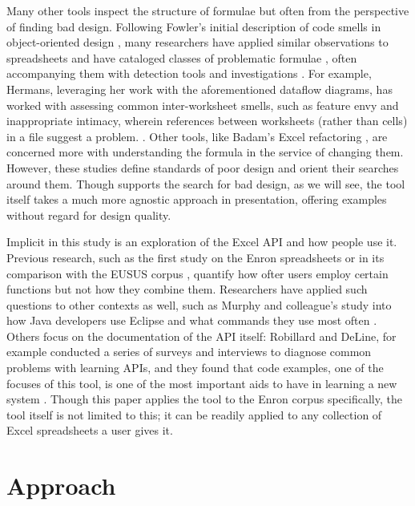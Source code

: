 \documentclass[conference]{IEEEtran}
\begin{document}
	Many other tools inspect the structure of formulae but often from the
	perspective of finding bad design.  Following Fowler's initial description of
	code smells in object-oriented design \cite{fowler2009refactoring}, many
	researchers have applied similar observations to spreadsheets and have
	cataloged classes of problematic formulae \cite{hermans2012detecting}
	\cite{cunha2012towards} \cite{asavametha2012detecting}, often accompanying them
	with detection tools \cite{abreu2014smelling} and investigations
	\cite{jansen2015code}. For example, Hermans, leveraging her work with the
	aforementioned dataflow diagrams, has worked with assessing common
	inter-worksheet smells, such as feature envy and inappropriate intimacy,
	wherein references between worksheets (rather than cells) in a file suggest a
	problem. \cite{hermans2012detectinginter}. Other tools, like Badam's Excel
	refactoring \cite{badame2012refactoring}, are concerned more with understanding
	the formula in the service of changing them. However, these studies define
	standards of poor design and orient their searches around them. Though
	\toolname supports the search for bad design, as we will see, the tool itself
	takes a much more agnostic approach in presentation, offering examples without
	regard for design quality. \par
	
	Implicit in this study is an exploration of the Excel API and how people use
	it. Previous research, such as the first study on the Enron spreadsheets
	\cite{hermans2015enron} or in its comparison with the EUSUS corpus
	\cite{jansen2015enron}, quantify how ofter users employ certain functions but
	not how they combine them. Researchers have applied such questions to other
	contexts as well, such as Murphy and colleague's study into how Java developers
	use Eclipse and what commands they use most often \cite{murphy2006java}. Others
	focus on the documentation of the API itself: Robillard and DeLine, for example
	conducted a series of surveys and interviews to diagnose common problems with
	learning APIs, and they found that code examples, one of the focuses of this
	tool, is one of the most important aids to have in learning a new system
	\cite{robillard2011field}. Though this paper applies the tool to the Enron
	corpus specifically, the tool itself is not limited to this; it can be readily
	applied to any collection of Excel spreadsheets a user gives it.
	
	\section{Approach}
	
\end{document}
